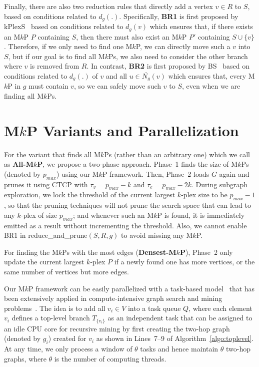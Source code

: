 \documentclass[sigconf, nonacm]{acmart}
\begin{document}
Finally, there are also two reduction rules that directly add a vertex $v\in R$ to $S$, based on conditions related to $d_g(.)$. Specifically, {\bf BR1} is first proposed by kPlexS~\cite{kPlexS} based on conditions related to $d_g(v)$ which ensures that, if there exists an M$k$P $P$ containing $S$, then there must also exist an M$k$P $P'$ containing $S\cup\{v\}$. Therefore, if we only need to find one M$k$P, we can directly move such a $v$ into $S$, but if our goal is to find all M$k$Ps, we also need to consider the other branch where $v$ is removed from $R$. 
%
In contrast, {\bf BR2} is first proposed by BS~\cite{BS} based on conditions related to $d_g(.)$ of $v$ and all $u\in\overline{N_g}(v)$ which ensures that, every M$k$P in $g$ must contain $v$, so we can safely move such $v$ to $S$, even when we are finding all M$k$Ps.

\vspace{-2mm}
\section{M$k$P Variants and Parallelization}\label{sec:variants}
 For the variant that finds all M$k$Ps (rather than an arbitrary one) which we call as {\bf All-M$k$P}, we propose a two-phase approach. Phase~1 finds the size of M$k$Ps (denoted by $p_{max}$) using our M$k$P framework. Then, Phase~2 loads $G$ again and prunes it using CTCP with $\tau_v=p_{max}-k$ and $\tau_e=p_{max}-2k$. During subgraph exploration, we lock the threshold of the current largest $k$-plex size to be $p_{max}-1$, so that the pruning techniques will not prune the search space that can lead to any $k$-plex of size $p_{max}$; and whenever such an M$k$P is found, it is immediately emitted as a result without incrementing the threshold. Also, we cannot enable BR1 in reduce\_and\_prune$(S,R,g)$ to avoid missing any M$k$P.

For finding the M$k$Ps with the most edges ({\bf Densest-M$k$P}), Phase~2 only update the current largest $k$-plex $P$ if a newly found one has more vertices, or the same number of vertices but more edges.

\vspace{1mm}
 Our M$k$P framework can be easily parallelized with a task-based model~\cite{t-thinker,jalal_vldbj} that has been extensively applied in compute-intensive graph search and mining problems~\cite{gthinker,gthinker2,guimu_vldb,jalal_vldbj,maximal_qihao,prefixfpm,tfsm,tdfs}. 
%
The idea is to add all $v_i\in V$ into a task queue $Q$, where each element $v_i$ defines a top-level branch $T_{\{v_i\}}$ as an independent task that can be assigned to an idle CPU core for recursive mining by first creating the two-hop graph (denoted by $g_i$) created for $v_i$ as shown in Lines~7--9 of Algorithm~\ref{algo:toplevel}. At any time, we only process a window of $\theta$ tasks and hence maintain $\theta$ two-hop graphs, where $\theta$ is the number of computing threads.
\end{document}
